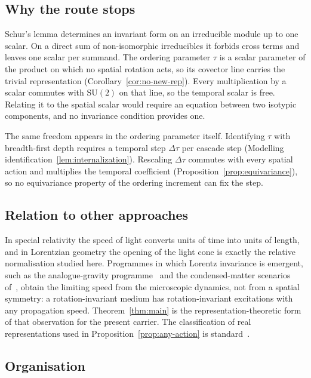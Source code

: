\documentclass[12pt,a4paper]{article}
\newcommand{\SU}{\mathrm{SU}}
\begin{document}
    \subsection{Why the route stops}

      Schur's lemma determines an invariant form on an irreducible module up to one scalar.
      On a direct sum of non-isomorphic irreducibles it forbids cross terms and leaves one scalar per summand.
      The ordering parameter $\tau$ is a scalar parameter of the product on which no spatial rotation acts, so its
      covector line carries the trivial representation (Corollary~\ref{cor:no-new-rep}).
      Every multiplication by a scalar commutes with $\SU(2)$ on that line, so the temporal scalar is free.
      Relating it to the spatial scalar would require an equation between two isotypic components, and no invariance
      condition provides one.

      The same freedom appears in the ordering parameter itself.
      Identifying $\tau$ with breadth-first depth requires a temporal step $\Delta\tau$ per cascade step
      (Modelling identification~\ref{lem:internalization}).
      Rescaling $\Delta\tau$ commutes with every spatial action and multiplies the temporal coefficient
      (Proposition~\ref{prop:equivariance}), so no equivariance property of the ordering increment can fix the
      step.

    \subsection{Relation to other approaches}

      In special relativity the speed of light converts units of time into units of length, and in Lorentzian
      geometry the opening of the light cone is exactly the relative normalisation studied here.
      Programmes in which Lorentz invariance is emergent, such as the analogue-gravity
      programme~\cite{BarceloLiberatiVisser2011} and the condensed-matter scenarios of~\cite{Volovik2003}, obtain the
      limiting speed from the microscopic dynamics, not from a spatial symmetry: a rotation-invariant medium has
      rotation-invariant excitations with any propagation speed.
      Theorem~\ref{thm:main} is the representation-theoretic form of that observation for the present carrier.
      The classification of real representations used in Proposition~\ref{prop:any-action} is
      standard~\cite{BrockerTomDieck1985,FultonHarris1991}.

    \subsection{Organisation}
\end{document}
